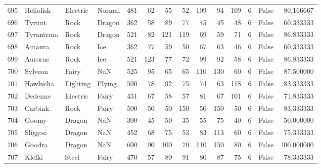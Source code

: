\begin{tabular}{rlllrrrrrrrrlr}
 695 &                  Heliolisk &  Electric &    Normal &    481 &   62 &      55 &       52 &      109 &       94 &    109 &           6 &      False &   80.166667 \\
 696 &                     Tyrunt &      Rock &    Dragon &    362 &   58 &      89 &       77 &       45 &       45 &     48 &           6 &      False &   60.333333 \\
 697 &                  Tyrantrum &      Rock &    Dragon &    521 &   82 &     121 &      119 &       69 &       59 &     71 &           6 &      False &   86.833333 \\
 698 &                     Amaura &      Rock &       Ice &    362 &   77 &      59 &       50 &       67 &       63 &     46 &           6 &      False &   60.333333 \\
 699 &                    Aurorus &      Rock &       Ice &    521 &  123 &      77 &       72 &       99 &       92 &     58 &           6 &      False &   86.833333 \\
 700 &                    Sylveon &     Fairy &       NaN &    525 &   95 &      65 &       65 &      110 &      130 &     60 &           6 &      False &   87.500000 \\
 701 &                   Hawlucha &  Fighting &    Flying &    500 &   78 &      92 &       75 &       74 &       63 &    118 &           6 &      False &   83.333333 \\
 702 &                    Dedenne &  Electric &     Fairy &    431 &   67 &      58 &       57 &       81 &       67 &    101 &           6 &      False &   71.833333 \\
 703 &                    Carbink &      Rock &     Fairy &    500 &   50 &      50 &      150 &       50 &      150 &     50 &           6 &      False &   83.333333 \\
 704 &                      Goomy &    Dragon &       NaN &    300 &   45 &      50 &       35 &       55 &       75 &     40 &           6 &      False &   50.000000 \\
 705 &                    Sliggoo &    Dragon &       NaN &    452 &   68 &      75 &       53 &       83 &      113 &     60 &           6 &      False &   75.333333 \\
 706 &                     Goodra &    Dragon &       NaN &    600 &   90 &     100 &       70 &      110 &      150 &     80 &           6 &      False &  100.000000 \\
 707 &                     Klefki &     Steel &     Fairy &    470 &   57 &      80 &       91 &       80 &       87 &     75 &           6 &      False &   78.333333 \\

\end{tabular}
